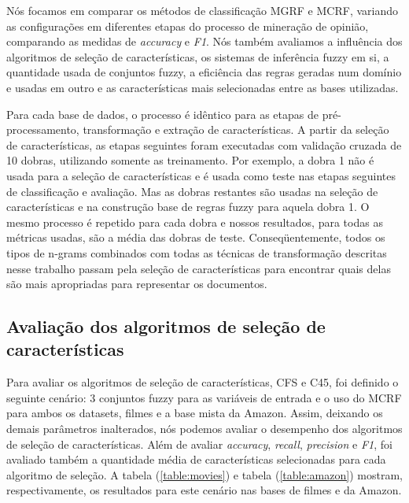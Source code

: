 Nós focamos em comparar os métodos de classificação MGRF e MCRF, variando as configurações em diferentes etapas do processo de mineração de opinião, comparando as medidas de \textit{accuracy} e \textit{F1}. Nós também avaliamos a influência dos algoritmos de seleção de características, os sistemas de inferência fuzzy em si, a quantidade usada de conjuntos fuzzy, a eficiência das regras geradas num domínio e usadas em outro e as características mais selecionadas entre as bases utilizadas. 

Para cada base de dados, o processo é idêntico para as etapas de pré-processamento, transformação e extração de características. A partir da seleção de características, as etapas seguintes foram executadas com validação cruzada de 10 dobras, utilizando somente as treinamento. Por exemplo, a dobra 1 não é usada para a seleção de características e é usada como teste nas etapas seguintes de classificação e avaliação. Mas as dobras restantes são usadas na seleção de características e na construção base de regras fuzzy para aquela dobra 1. O mesmo processo é repetido para cada dobra e nossos resultados, para todas as métricas usadas, são a média das dobras de teste. Conseqüentemente, todos os tipos de n-grams combinados com todas as técnicas de transformação descritas nesse trabalho passam pela seleção de características para encontrar quais delas são mais apropriadas para representar os documentos. 

\subsection{Avaliação dos algoritmos de seleção de características}

Para avaliar os algoritmos de seleção de características, CFS e C45, foi definido o seguinte cenário: 3 conjuntos fuzzy para as variáveis de entrada e o uso do MCRF para ambos os datasets, filmes e a base mista da Amazon. Assim, deixando os demais parâmetros inalterados, nós podemos avaliar o desempenho dos algoritmos de seleção de características. Além de avaliar \textit{accuracy}, \textit{recall}, \textit{precision} e \textit{F1}, foi avaliado também a quantidade média de características selecionadas para cada algoritmo de seleção. A tabela (\ref{table:movies}) e tabela (\ref{table:amazon}) mostram, respectivamente, os resultados para este cenário nas bases de filmes e da Amazon. 

